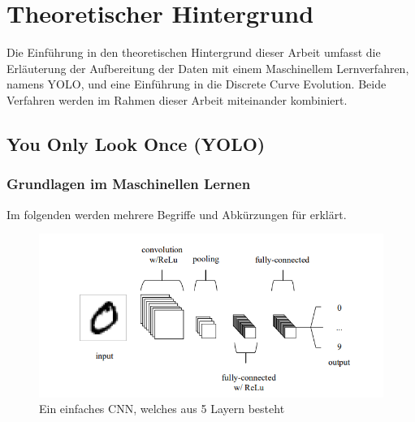 \chapter{Theoretischer Hintergrund}
\label{ch:Theoretischer Hintergrund}
{Die Einführung in den theoretischen Hintergrund dieser Arbeit umfasst die Erläuterung der Aufbereitung der Daten mit einem Maschinellem Lernverfahren, namens YOLO, und eine Einführung in die \glqq Discrete Curve Evolution\grqq{}. Beide Verfahren werden im Rahmen dieser Arbeit miteinander kombiniert.
}



\section{\glqq You Only Look Once \grqq (YOLO)}
{
	\subsection{Grundlagen im Maschinellen Lernen}
	{ 
	Im folgenden werden mehrere Begriffe und Abkürzungen für  erklärt. \\
	\begin{figure}[ht]
		\centering
		\includegraphics*[scale = 0.8, keepaspectratio, trim=2 2 2 2 ]{images/YOLO/YOLO_Preamble_Simple_CNN.png}
		\caption[Ein einfaches Convolutional Neural Network]{Ein einfaches CNN, welches aus 5 Layern besteht \citep{OSheaRyan2022}}
		\label{YOLO_simple_CNN}
 	\end{figure}

}}
